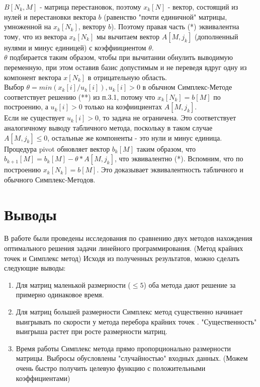 \documentclass{article}
\begin{document}
        $B[N_k, M]$ - матрица перестановок, поэтому $x_k[N]$ - вектор, состоящий из нулей и перестановки вектора $b$ (равенство "почти единичной" матрицы, умноженной на $x_k[N_k]$, вектору $b$).
        Поэтому правая часть (*) эквивалентна тому, что из вектора $x_k[N_k]$ мы вычитаем вектор $A[M, j_k]$ (дополненный нулями и минус единицей) с коэффиициентом $\theta$.\\
        $\theta$ подбирается таким образом, чтобы при вычитании обнулить выводимую переменную, при этом оставив базис допустимым и не переведя вдруг одну из компонент вектора $x[N_k]$ в отрицательную область. \\
        Выбор $\theta = min(x_k[i] / u_k[i]), u_k[i] > 0$ в обычном Симплекс-Методе соответствует решению (**) из п.3.1, потому что $x_k[N_k] = b[M]$ по построению, а $u_k[i] > 0$ только на коэфиициентах $A[M, j_k]$.\\
        Если не существует $u_k[i] > 0$, то задача не ограничена. Это соответствует аналогичному выводу табличного метода, поскольку в таком случае $A[M, j_k] \leq 0$, остальные же компоненты - это нули и минус единица.\\
        Процедура pivot обновляет вектор $b_k[M]$ таким образом, что $b_{k+1}[M] = b_k[M] - \theta * A[M, j_k]$, что эквивалентно (*). Вспомним, что по построению $x_k[N_k] = b[M]$. Это доказывает эквивалентность табличного и обычного Симплекс-Методов.


    \section{Выводы}
    В работе были проведены исследования по сравнению двух методов нахождения оптимального решения задачи линейного программирования. (Метод крайних точек и Симплекс метод)
Исходя из полученных результатов, можно сделать следующие выводы:
\begin{enumerate}
    \item Для матриц маленькой размерности ($\le 5$) оба метода дают решение за примерно одинаковое время.
    \item Для матриц большей размерности Симплекс метод существенно начинает выигрывать по скорости у метода перебора крайних точек . "Существенность" выигрыша растет при росте размерности матриц.
    \item Время работы Симплекс метода прямо пропорционально размерности матрицы. Выбросы обусловлены "случайностью" входных данных. (Можем очень быстро получить целевую функцию с положительными коэффициентами)
\end{enumerate}
\end{document}
